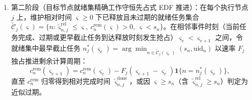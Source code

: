 \begin{definition}
\begin{enumerate}
\begin{equation}
 \tilde\varsigma_{n,j}^{\mathrm{rel}}(s,k,m)=
 \begin{cases}
 \tilde\varsigma_n^{\mathrm{up}}, & j=u_n,\\
 \max\big(\varsigma^{\mathrm{inter/bh}}_{\mathrm{free}},\,\tilde\varsigma_n^{\mathrm{up}}\big)+\Delta\tilde\varsigma_{n,u_n,j}^{\mathrm{tr}}, & j\neq u_n\text{ 且链路可达},
 \end{cases}
 \label{eq:ch5-release-time-stage1}
\end{equation}
若 $\tilde\varsigma_{n,j}^{\mathrm{rel}}\geq s_n$ 则直接记入通信阶段溢出，否则在 $j\neq u_n$（且跨节点传输增量非零）时同步更新共享机间或回传可用时刻 $\varsigma^{\mathrm{inter/bh}}_{\mathrm{free}}\leftarrow\max\big(\varsigma^{\mathrm{inter/bh}}_{\mathrm{free}},\tilde\varsigma_{n,j}^{\mathrm{rel}}\big)$，并将任务元组 $(\tilde\varsigma_{n,j}^{\mathrm{rel}},\,\allowbreak c_n^{\mathrm{rem}}/F_j,\,\allowbreak s_n,\,\allowbreak \min(3.0,s_n),\,\allowbreak \mathrm{uid}_n)$ 加入节点 $j$ 的待计算列表；对候选评估中传入的待接纳任务（$s_n>1.0\,\mathrm{s}$ 且在终点 $\mathbf q_{u,m}^{\mathrm{after}}$ 进入最近无人机覆盖），自 $\max(1.0,\varsigma^{\mathrm{up}}_{\mathrm{tail}}(u))$ 起估算上传并贪心选择预计最早完成的可达节点并入对应列表。

\item 第二阶段（目标节点就绪集精确工作守恒先占式 EDF 推进）：在每个执行节点 $j$ 上，维护相对时间 $\varsigma\geq 0$ 下已释放且未过期的就绪任务集合 $\tilde{\mathcal C}_j(\varsigma)=\{n:\tilde\varsigma_{n,j}^{\mathrm{rel}}\leq\varsigma,\ \allowbreak c_n^{\mathrm{rem}}(\varsigma)>0,\ \allowbreak \varsigma<s_n\}$。在相邻事件时刻（当前任务完成、过期或更早截止任务到达释放时刻发生抢占）$\varsigma_e<\varsigma_{e+1}$ 之间，令就绪集中最早截止任务 $n_j^*(\varsigma_e)=\arg\min_{n\in\tilde{\mathcal C}_j(\varsigma_e)}(s_n,\mathrm{uid}_n)$ 以速率 $F_j$ 独占推进剩余计算周期：
\begin{equation}
 c_n^{\mathrm{rem}}(\varsigma_{e+1})=c_n^{\mathrm{rem}}(\varsigma_e)-F_j(\varsigma_{e+1}-\varsigma_e)\mathbf 1\{n=n_j^*(\varsigma_e)\},
 \label{eq:ch5-release-time-stage2}
\end{equation}
直至 $c_n^{\mathrm{rem}}$ 归零得到相对完成时间 $\tilde\varsigma_{n,j}^{\mathrm{done}}$，或因 $\varsigma\geq s_n$（含 $\tilde\varsigma_{n,j}^{\mathrm{rel}}\geq s_n$）判定为近似过期。
\end{enumerate}
\end{definition}

